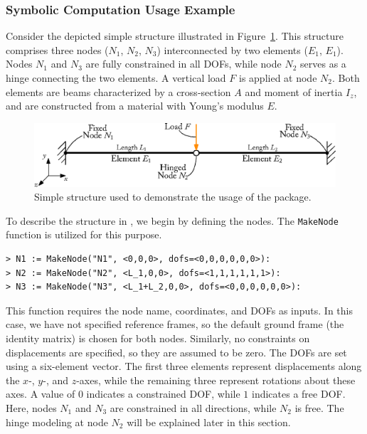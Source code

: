 \subsubsection{Symbolic Computation Usage Example}

Consider the depicted simple structure illustrated in Figure~\ref{app4:fig:usage_example}. This structure comprises three nodes ($N_1$, $N_2$, $N_3$) interconnected by two elements ($E_1$, $E_1$). Nodes $N_1$ and $N_3$ are fully constrained in all \acp{DOF}, while node $N_2$ serves as a hinge connecting the two elements. A vertical load $F$ is applied at node $N_2$. Both elements are beams characterized by a cross-section $A$ and moment of inertia $I_z$, and are constructed from a material with Young's modulus $E$.

\begin{figure}[htb]
  \centering
  \includegraphics[width=1.0\textwidth]{./figures/appendix_4/usage_example.eps}
  \caption{Simple structure used to demonstrate the usage of the \TrussMe{} package.}
  \label{app4:fig:usage_example}
\end{figure}

To describe the structure in \TrussMe{}, we begin by defining the nodes. The \texttt{MakeNode} function is utilized for this purpose.
%
\begin{verbatim}
> N1 := MakeNode("N1", <0,0,0>, dofs=<0,0,0,0,0,0>):
> N2 := MakeNode("N2", <L_1,0,0>, dofs=<1,1,1,1,1,1>):
> N3 := MakeNode("N3", <L_1+L_2,0,0>, dofs=<0,0,0,0,0,0>):
\end{verbatim}
%
This function requires the node name, coordinates, and \acp{DOF} as inputs. In this case, we have not specified reference frames, so the default ground frame (the identity matrix) is chosen for both nodes. Similarly, no constraints on displacements are specified, so they are assumed to be zero. The \acp{DOF} are set using a six-element vector. The first three elements represent displacements along the $x$-, $y$-, and $z$-axes, while the remaining three represent rotations about these axes. A value of $0$ indicates a constrained \ac{DOF}, while $1$ indicates a free \ac{DOF}. Here, nodes $N_1$ and $N_3$ are constrained in all directions, while $N_2$ is free. The hinge modeling at node $N_2$ will be explained later in this section.

